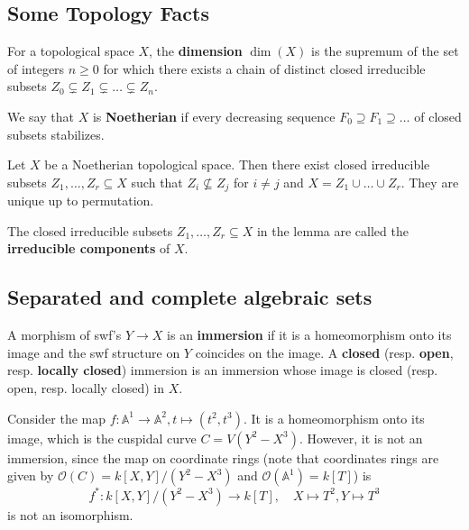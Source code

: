 \documentclass{template}
\begin{document}
\subsection{Some Topology Facts}

\begin{definition}
    For a topological space $X$, the \textbf{dimension} $\dim(X)$ is the 
    supremum of the set of integers $n \geq 0$ for which there exists a chain of 
    distinct closed irreducible subsets $Z_0 \subsetneq Z_1 \subsetneq \dots \subsetneq Z_n$.
\end{definition}

\begin{definition}
    We say that $X$ is \textbf{Noetherian} if every decreasing sequence 
    $F_0 \supseteq F_1 \supseteq \dots$ of closed subsets stabilizes.
\end{definition}

\begin{lemma}
    Let $X$ be a Noetherian topological space. Then there exist closed irreducible
    subsets $Z_1,\dots,Z_r \subseteq X$ such that $Z_i \not\subseteq Z_j$ for $i \neq j$ and 
    $X = Z_1 \cup \dots \cup Z_r$. They are unique up to permutation.
\end{lemma}

\begin{definition}
    The closed irreducible subsets $Z_1,\dots,Z_r \subseteq X$ in the lemma are 
    called the \textbf{irreducible components} of $X$.
\end{definition}

\subsection{Separated and complete algebraic sets}

\begin{definition}
    A morphism of swf's $Y \to X$ is an \textbf{immersion} if it is a homeomorphism
    onto its image and the swf structure on $Y$ coincides on the image. A \textbf{closed}
    (resp. \textbf{open}, resp. \textbf{locally closed}) immersion is an immersion
    whose image is closed (resp. open, resp. locally closed) in $X$.
\end{definition}

\begin{example}
    Consider the map $f: \mathbb{A}^1 \to \mathbb{A}^2, t \mapsto (t^2,t^3)$. It
    is a homeomorphism onto its image, which is the cuspidal curve
    $C=V(Y^2-X^3)$. However, it is not an immersion, since the map on coordinate
    rings (note that coordinates rings are given by $\mathcal{O}(C)=k[X,Y]/(Y^2-X^3)$ and
    $\mathcal{O}(\mathbb{A}^1)=k[T]$) is 
    \begin{equation*}
        f^*: k[X,Y]/(Y^2-X^3) \to k[T], \quad X \mapsto T^2, Y \mapsto T^3
    \end{equation*}
    is not an isomorphism.
\end{example}
\end{document}
